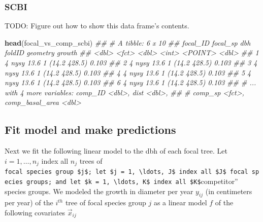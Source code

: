 \documentclass[12pt]{article}
\newenvironment{Shaded}{\begin{snugshade}}{\end{snugshade}}
\newcommand{\CommentTok}[1]{\textcolor[rgb]{0.56,0.35,0.01}{\textit{#1}}}
\newcommand{\DataTypeTok}[1]{\textcolor[rgb]{0.13,0.29,0.53}{#1}}
\newcommand{\KeywordTok}[1]{\textcolor[rgb]{0.13,0.29,0.53}{\textbf{#1}}}
\newcommand{\NormalTok}[1]{#1}
\newcommand{\OperatorTok}[1]{\textcolor[rgb]{0.81,0.36,0.00}{\textbf{#1}}}
\newcommand{\StringTok}[1]{\textcolor[rgb]{0.31,0.60,0.02}{#1}}
\begin{document}
\hypertarget{scbi-2}{%
\subsubsection{SCBI}\label{scbi-2}}

\begin{Shaded}
\end{Shaded}

TODO: Figure out how to show this data frame's contents.

\begin{Shaded}
\begin{Highlighting}[]
\KeywordTok{head}\NormalTok{(focal_vs_comp_scbi)}
\CommentTok{## # A tibble: 6 x 10}
\CommentTok{##   focal_ID focal_sp   dbh foldID                  geometry growth}
\CommentTok{##      <dbl> <fct>    <dbl>  <int>                   <POINT>  <dbl>}
\CommentTok{## 1        4 nysy      13.6      1              (14.2 428.5)  0.103}
\CommentTok{## 2        4 nysy      13.6      1              (14.2 428.5)  0.103}
\CommentTok{## 3        4 nysy      13.6      1              (14.2 428.5)  0.103}
\CommentTok{## 4        4 nysy      13.6      1              (14.2 428.5)  0.103}
\CommentTok{## 5        4 nysy      13.6      1              (14.2 428.5)  0.103}
\CommentTok{## 6        4 nysy      13.6      1              (14.2 428.5)  0.103}
\CommentTok{## # ... with 4 more variables: comp_ID <dbl>, dist <dbl>,}
\CommentTok{## #   comp_sp <fct>, comp_basal_area <dbl>}
\end{Highlighting}
\end{Shaded}

\hypertarget{model-fit-predict}{%
\subsection{Fit model and make predictions}\label{model-fit-predict}}

Next we fit the following linear model to the dbh of each focal tree.
Let \(i = 1, \ldots, n_j\) index all \(n_j\) trees of
\texttt{focal\textquotesingle{}\textquotesingle{}\ species\ group\ \$j\$;\ let\ \$j\ =\ 1,\ \textbackslash{}ldots,\ J\$\ index\ all\ \$J\$\ focal\ species\ groups;\ and\ let\ \$k\ =\ 1,\ \textbackslash{}ldots,\ K\$\ index\ all\ \$K\$}competitor''
species groups. We modeled the growth in diameter per year \(y_{ij}\)
(in centimeters per year) of the \(i^{th}\) tree of focal species group
\(j\) as a linear model \(f\) of the following covariates
\(\vec{x}_{ij}\)
\end{document}
